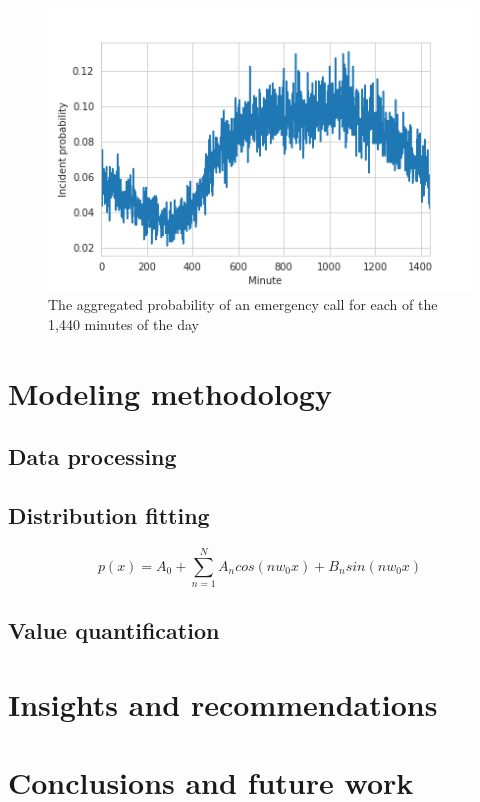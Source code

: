 \documentclass[article]{proc}
\begin{document}
\begin{figure}[!htb]
  \centering
  \includegraphics[width=12cm,keepaspectratio]{Figures/raw_signal.png}
  \caption{The aggregated probability of an emergency call for each of the 1,440 minutes of the day}
  \label{fig:raw_signal}
\end{figure}



\section{Modeling methodology}
\subsection{Data processing}
\subsection{Distribution fitting}
\begin{equation}
p(x) = A_0 + \sum_{n=1}^{N} A_ncos(nw_0x) + B_nsin(nw_0x)
\label{eq:fourier_poly}
\end{equation}

\subsection{Value quantification}




\section{Insights and recommendations}


\section{Conclusions and future work}





\scriptsize{

}
\end{document}
